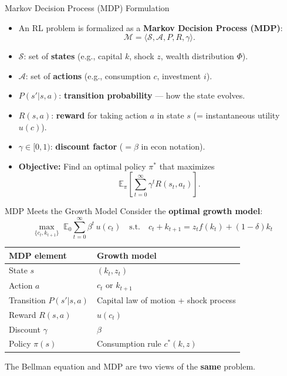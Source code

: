 \documentclass[10pt,english,aspectratio=169]{beamer}
\begin{document}
\begin{frame}{Markov Decision Process (MDP) Formulation}
\begin{itemize}
  \item An RL problem is formalized as a \textbf{Markov Decision Process (MDP)}:
  \[
    \mathcal{M} = \langle \mathcal{S}, \mathcal{A}, P, R, \gamma \rangle.
  \]
  \item $\mathcal{S}$: set of \textbf{states} (e.g., capital $k$, shock $z$, wealth distribution $\Phi$).
  \item $\mathcal{A}$: set of \textbf{actions} (e.g., consumption $c$, investment $i$).
  \item $P(s'|s,a)$: \textbf{transition probability} --- how the state evolves.
  \item $R(s,a)$: \textbf{reward} for taking action $a$ in state $s$ (= instantaneous utility $u(c)$).
  \item $\gamma \in [0,1)$: \textbf{discount factor} ($= \beta$ in econ notation).
  \item \textbf{Objective:} Find an optimal policy $\pi^*$ that maximizes
  \[
    \mathbb{E}_\pi\!\left[\sum_{t=0}^\infty \gamma^t R(s_t, a_t)\right].
  \]
\end{itemize}
\end{frame}

\begin{frame}{MDP Meets the Growth Model}
Consider the \textbf{optimal growth model}:
\[
\max_{\{c_t, k_{t+1}\}} \; \mathbb{E}_0 \sum_{t=0}^{\infty} \beta^t \, u(c_t)
\quad \text{s.t.} \quad
c_t + k_{t+1} = z_t f(k_t) + (1-\delta) k_t
\]

\vspace{0.3cm}
\begin{center}
\small
\begin{tabular}{ll}
\toprule
\textbf{MDP element} & \textbf{Growth model} \\
\midrule
State $s$ & $(k_t, z_t)$ \\
Action $a$ & $c_t$ or $k_{t+1}$ \\
Transition $P(s'|s,a)$ & Capital law of motion + shock process \\
Reward $R(s,a)$ & $u(c_t)$ \\
Discount $\gamma$ & $\beta$ \\
Policy $\pi(s)$ & Consumption rule $c^*(k,z)$ \\
\bottomrule
\end{tabular}
\end{center}

\vspace{0.3cm}
The Bellman equation and MDP are two views of the \textbf{same} problem.
\end{frame}
\end{document}
